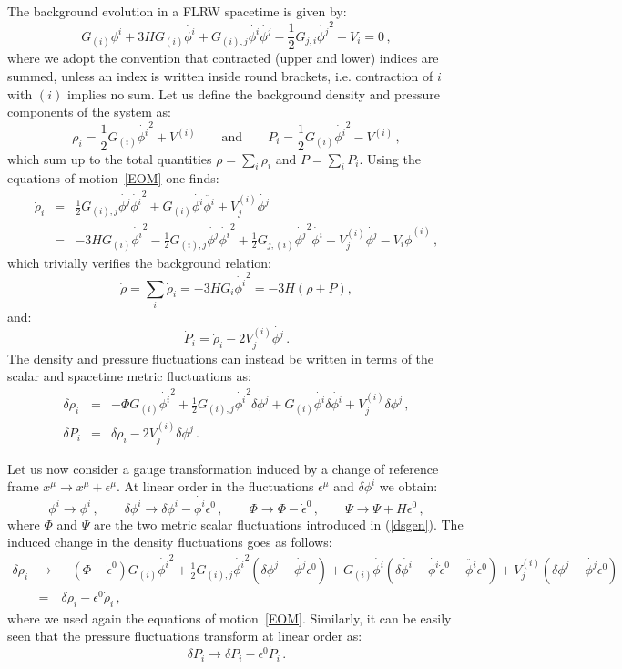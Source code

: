 \documentclass[a4paper,11pt]{article}
\def\be{\begin{equation}}
\def\ee{\end{equation}}
\def\bea{\begin{eqnarray}}
\def\eea{\end{eqnarray}}
\begin{document}
The background evolution in a FLRW spacetime is given by:
\be
G_{(i)} \ddot {\phi^i}+3H G_{(i)} \dot{\phi^i}+ G_{{(i)},j} \dot{\phi^i} \dot{\phi^j}-\frac12 G_{j,i} \dot{\phi^j}^2+ V_i=0 \,,
\label{EOM}
\ee
where we adopt the convention that contracted (upper and lower) indices are summed, unless an index is written inside round brackets, i.e. contraction of $i$ with $(i)$ implies no sum. Let us define the background density and pressure components of the system as:
\be
\rho_i=\frac12 G_{(i)} \dot{\phi^i}^2+V^{(i)} \qquad\text{and}\qquad
P_i =\frac12 G_{(i)} \dot{\phi^i}^2-V^{(i)} \,,
\ee
which sum up to the total quantities $\rho=\sum_i \rho_i$ and $P=\sum_i P_i$. Using the equations of motion~\eqref{EOM} one finds:
\bea
\dot \rho_i&=& \frac12 G_{(i),j} \dot {\phi^j} \dot{\phi^i}^2 +G_{(i)} \dot {\phi^i} \ddot {\phi^i} + V^{(i)}_j \dot {\phi^j}\nonumber\\
&=& -3H G_{(i)} \dot {\phi^i}^2-\frac12 G_{(i),j} \dot {\phi^j} \dot{\phi^i}^2+\frac12 G_{j,(i)} \dot {\phi^j}^2 \dot{\phi^i}
+V^{(i)}_j \dot {\phi^j}- V_i \dot\phi^{(i)}\,,
\eea
which trivially verifies the background relation:
\be
\dot \rho = \sum_i \dot \rho_i = -3 H G_i \dot {\phi^i}^2 = -3H \left(\rho+P\right),
\ee
and:
\be
\dot P_i= \dot \rho_i - 2 V^{(i)}_j \dot {\phi^j}\,.
\ee
The density and pressure fluctuations can instead be written in terms of the scalar and spacetime metric fluctuations as:
\bea
\delta \rho_i &=& -\Phi G_{(i)} \dot {\phi^i}^2 +  \frac12 G_{(i),j} \dot {\phi^i}^2 \delta \phi^j+G_{(i)} \dot {\phi^i} \delta \dot{\phi^i}+ V^{(i)}_j \delta \phi^j\,, \\
\delta P_i &=& \delta\rho_i- 2 V^{(i)}_j \delta \phi^j\,.
\eea

Let us now consider a gauge transformation induced by a change of reference frame $x^\mu \to x^\mu+\epsilon^\mu$. At linear order in the fluctuations $\epsilon^\mu$ and $\delta\phi^i$ we obtain:
\be
\phi^i \to \phi^i\,,\qquad
\delta \phi^i \to \delta \phi^i - \dot {\phi^i} \epsilon^0\,, \qquad \Phi \to \Phi - \dot \epsilon^0\,, \qquad \Psi \to \Psi + H \epsilon^0 \,,
\label{gaugevar}
\ee
where $\Phi$ and $\Psi$ are the two metric scalar fluctuations introduced in (\ref{dsgen}). The induced change in the density fluctuations goes as follows:
\bea
\delta \rho_i &\to& -(\Phi - \dot \epsilon^0) G_{(i)} \dot{ \phi^i}^2 +  \frac12 G_{(i),j} \dot {\phi^i}^2 (\delta \phi^j -\dot {\phi^j} \epsilon^0)+
G_{(i)} \dot {\phi^i} (\delta \dot{\phi^i} -\dot {\phi^i} \dot \epsilon^0 - \ddot {\phi^i} \epsilon^0)+ V^{(i)}_j (\delta \phi^j - \dot {\phi^j} \epsilon^0) \nonumber \\
&=& \delta \rho_i - \epsilon^0 \dot{\rho}_i\,,
\label{varrho}
\eea
where we used again the equations of motion~\eqref{EOM}. Similarly, it can be easily seen that the pressure fluctuations transform at linear order as:
\be
\delta P_i\to  \delta P_i - \epsilon^0 \dot{P}_i\,.
\label{varP}
\ee
\end{document}
